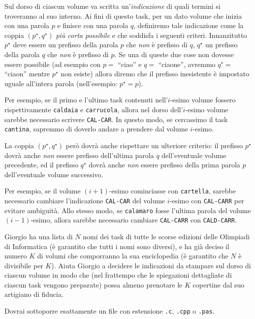 Sul dorso di ciascun volume va scritta un'\emph{indicazione} di quali termini si troveranno al suo interno. Ai fini di questo task, per un dato volume che inizia con una parola $p$ e finisce con una parola $q$, definiremo tale indicazione come la coppia $(p^\star, q^\star)$ \emph{pi\`u corta possibile} e che soddisfa i seguenti criteri. Innanzitutto $p^\star$ deve essere un prefisso della parola $p$ che \emph{non} è prefisso di $q$, $q^\star$ un prefisso della parola $q$ che \emph{non} è prefisso di $p$. Se una di queste due cose non dovesse essere possibile (ad esempio con $p = $ ``ciao'' e $q = $ ``ciaone'', avremmo $q^\star = $ ``ciaon'' mentre $p^\star$ non esiste) allora diremo che il prefisso inesistente è impostato uguale all'intera parola (nell'esempio: $p^\star = p$).

Per esempio, se il primo e l'ultimo task contenuti nell'$i$-esimo volume fossero rispettivamente \texttt{caldaia} e \texttt{carrucola}, allora nel dorso dell'$i$-esimo volume sarebbe necessario scrivere \texttt{CAL-CAR}. In questo modo, se cercassimo il task \texttt{cantina}, sapremmo di doverlo andare a prendere dal volume $i$-esimo.

La coppia $(p^\star, q^\star)$ per\`o dovrà anche rispettare un ulteriore criterio: il prefisso $p^\star$ dovrà anche \emph{non} essere prefisso dell'ultima parola $q$ dell'eventuale volume precedente, ed il prefisso $q^\star$ dovrà anche \emph{non} essere prefisso della prima parola $p$ dell'eventuale volume successivo.

Per esempio, se il volume $(i+1)$-esimo cominciasse con \texttt{cartella}, sarebbe necessario cambiare l'indicazione \texttt{CAL-CAR} del volume $i$-esimo con \texttt{CAL-CARR} per evitare ambiguità. Allo stesso modo, se \texttt{calamaro} fosse l'ultima parola del volume $(i-1)$-esimo, allora sarebbe necessario cambiare \texttt{CAL-CARR} con \texttt{CALD-CARR}.

Giorgio ha una lista di $N$ nomi dei task di tutte le scorse edizioni delle Olimpiadi di Informatica (è garantito che tutti i nomi sono diversi), e ha già deciso il numero $K$ di volumi che comporranno la sua enciclopedia (è garantito che $N$ è divisibile per $K$). Aiuta Giorgio a decidere le indicazioni da stampare sul dorso di ciascun volume in modo che (nel frattempo che le spiegazioni dettagliate di ciascun task vengono preparate) possa almeno prenotare le $K$ copertine dal suo artigiano di fiducia.

\Implementation
Dovrai sottoporre esattamente un file con estensione \texttt{.c}, \texttt{.cpp} o \texttt{.pas}.

